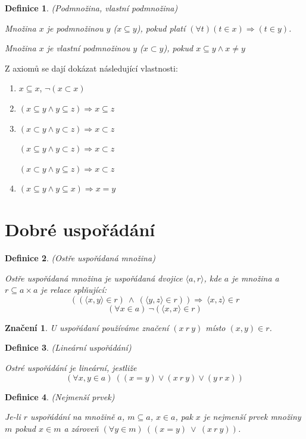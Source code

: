 \documentclass[a4paper,10pt,titlepage]{article} \usepackage[utf8]{inputenc}
\newtheorem{define}{Definice}
\newtheorem*{notation}{Značení}
\begin{document}
\begin{define}
(Podmnožina, vlastní podmnožina)

Množina $x$ je podmnožinou $y$ ($x\subseteq y$), pokud platí $(\forall t) (t \in x) \Rightarrow (t \in y)$.

Množina $x$ je vlastní podmnožinou $y$ ($x\subset y$), pokud $x\subseteq y \wedge x \neq y$
\end{define}

Z axiomů se dají dokázat následující vlastnosti:
\begin{enumerate}
\item $x\subseteq x$, $\neg(x \subset x)$
\item $(x \subseteq y \wedge y \subseteq z) \Rightarrow x \subseteq z$
\item $(x \subset y \wedge y \subset z) \Rightarrow x \subset z$

	  $(x \subseteq y \wedge y \subset z) \Rightarrow x \subset z$
	
	  $(x \subset y \wedge y \subseteq z) \Rightarrow x \subset z$
\item $(x \subseteq y \wedge y \subseteq x) \Rightarrow x = y$
\end{enumerate}

\section{Dobré uspořádání}
\begin{define}
(Ostře uspořádaná množina)

Ostře uspořádaná množina je uspořádaná dvojice $\langle a , r \rangle $, kde $a$ je množina a $r\subseteq a \times a$ je relace splňující:
\[
((\langle x , y \rangle  \in r)\ \wedge\ (\langle y , z \rangle  \in r)) \Rightarrow \ \langle x , z \rangle  \in r
\]
\[
(\forall x \in a)\ \neg (\langle x , x \rangle  \in r)
\]
\end{define}

\begin{notation}
U uspořádaní používáme značení $(x\ r\ y)$ místo $(x,y) \in r$.
\end{notation}

\begin{define}
(Lineární uspořádání)

Ostré uspořádání je lineární, jestliže
\[
 (\forall x,y \in a)\ ((x=y) \vee (x\ r\ y) \vee (y\ r\ x))
\]
\end{define}

\begin{define}
(Nejmenší prvek)

Je-li $r$ uspořádání na množině $a$, $m \subseteq a$, $x \in a$, pak $x$ je nejmenší prvek množiny $m$
pokud $x \in m$ a zároveň $(\forall y \in m)\ ((x = y)\ \vee \ (x\ r\ y))$.
\end{define}
\end{document}
